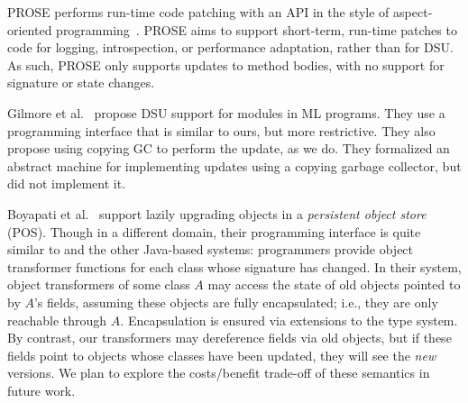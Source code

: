 

PROSE performs run-time
code patching with an API in the style of aspect-oriented
programming~\cite{nicoara:eurosys08}.  PROSE aims to support
short-term, run-time patches to code for logging, introspection, or
performance adaptation, rather than for DSU. %
As such, PROSE only supports updates to method bodies,
with no support for signature or state changes. %

Gilmore et al.~\cite{GilmoreKW97} propose DSU support for modules in
ML programs. They use a programming interface that is similar to ours, but
more restrictive.  They also propose using copying GC to perform the
update, as we do.  They formalized an abstract machine for
implementing updates using a copying garbage collector, but did not
implement it.

 
Boyapati et al.~\cite{boyapati03lazy} support lazily upgrading objects
in a \emph{persistent object store} (POS).  Though in a different
domain, their programming interface is quite similar to \DSU{} and the
other Java-based systems: programmers provide object transformer
functions for each class whose signature has changed.  In their system, object
transformers %
of some class $A$ may access the state of
old objects pointed to by $A$'s fields, assuming these objects are
fully encapsulated; i.e., they are only reachable through $A$.
Encapsulation is ensured via extensions to the type system.  By
contrast, our transformers may dereference fields via old objects, but
if these fields point to objects whose classes have been updated, they
will see the \emph{new} versions. %
We plan to explore the costs/benefit trade-off of these
semantics in future work.


